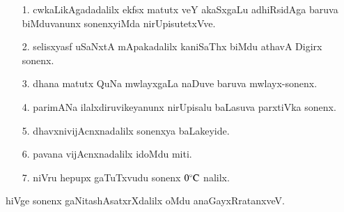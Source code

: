 \begin{enumerate}
\item[\rm 1.] cwkaLikAgadadalilx ekfsx matutx veY akaSxgaLu adhiRsidAga baruva biMduvanunx sonenxyiMda nirUpisutetxVve.
\item[\rm 2.] selisxyasf uSaNxtA mApakadalilx kaniSaThx biMdu athavA Digirx sonenx.
\item[\rm 3.] dhana matutx QuNa mwlayxgaLa naDuve baruva mwlayx-sonenx.
\item[\rm 4.] parimANa ilalxdiruvikeyanunx nirUpisalu baLasuva parxtiVka sonenx.
\item[\rm 5.] dhavxnivijAcnxnadalilx sonenxya baLakeyide.
\item[\rm 6.] pavana vijAcnxnadalilx idoMdu miti.
\item[\rm 7.] niVru hepupx gaTuTxvudu sonenx $0^{\circ}{\rm C}$ nalilx.
\end{enumerate}
hiVge sonenx gaNitashAsatxrXdalilx oMdu anaGayxRratanxveV.

